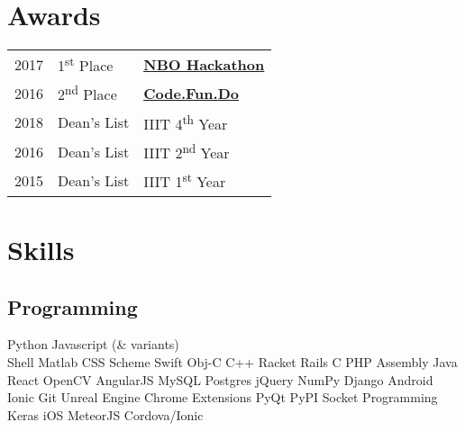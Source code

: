 \documentclass[]{deedy-resume-openfont}
\begin{document}
\begin{minipage}[t]{0.33\textwidth}
\section{Awards} 
\begin{tabular}{rll}
2017	     & 1\textsuperscript{st} Place  & \textbf{\underline{\href{https://www.nbo.om/en/Pages/Competitions/NBO-Hackathon.aspx}{NBO Hackathon}}}\\
2016	     & 2\textsuperscript{nd} Place & \textbf{\underline{\href{https://www.acadaccelerator.com/}{Code.Fun.Do}}}\\
2018         & Dean's List  & IIIT 4\textsuperscript{th} Year\\
2016	     & Dean's List  & IIIT 2\textsuperscript{nd} Year\\
2015	     & Dean's List  & IIIT 1\textsuperscript{st} Year\\

\end{tabular}
\sectionsep


\section{Skills}
\subsection{Programming}
 Python \textbullet{} Javascript (\& variants) \\
\textbullet{}   Shell \textbullet{} Matlab \textbullet{} CSS
\textbullet{} Scheme 
\textbullet{} Swift 
\textbullet{} Obj-C
\textbullet{} C++ \textbullet{} Racket \textbullet{} Rails \textbullet{} C \textbullet{} PHP \textbullet{} Assembly  \textbullet{} Java   \\
React \textbullet{} OpenCV \textbullet{} AngularJS \textbullet{} MySQL \textbullet{} Postgres \textbullet jQuery \textbullet{} NumPy \textbullet{} Django \textbullet{} Android
\textbullet{} Ionic \textbullet{} Git \textbullet{} Unreal Engine
\textbullet{} Chrome Extensions \textbullet{} PyQt \textbullet{} PyPI \textbullet{} Socket Programming \textbullet{} Keras \textbullet{} iOS \textbullet{} MeteorJS \textbullet{} Cordova/Ionic
\sectionsep



\end{minipage}
\end{document}
